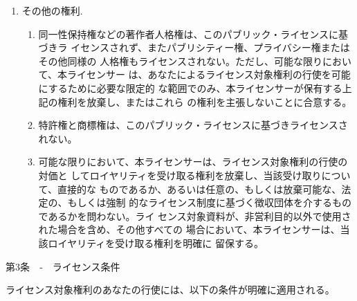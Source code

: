 {\begin{enumerate}
\begin{enumerate}
\begin{enumerate}
ンス対象権利を行使する申込みを、本ライセンサーから自動的に受領する。
\item ダウンストリームの制限の否定 ライセンス対象資料について、追加的な条件
や異なる条件を申込むことにより、もしくはそうした条件を課すことにより、
または効果的な技術的手段を適用することにより、ライセンス対象資料の受領
者によるライセンス対象権利の行使が制限される場合、あなたは、そうした行
為を行うことはできない。
\end{enumerate}
\item 保証の否定 このパブリック・ライセンスのいかなる規定も、あなたは、もし
くはライセンス対象資料のあなたの使用は、本ライセンサーに関連するという
ことを、もしくは条項3(a)(1)(A)(i)の規定に従いクレジット表示を受けるた
めに指定されたその他のものに関連するということを、またはあなたは、もし
くはライセンス対象資料のあなたの使用は、本ライセンサーもしくは当該その
他の者により支援される、保証される、もしくは公的地位を与えられるという
ことを主張する許可ではなく、そうした許可として解釈することはできず、ま
た上記のことを意味しない。
\end{enumerate}
\item その他の権利.
\begin{enumerate}
\item 同一性保持権などの著作者人格権は、このパブリック・ライセンスに基づきラ
イセンスされず、またパブリシティー権、プライバシー権またはその他同様の
人格権もライセンスされない。ただし、可能な限りにおいて、本ライセンサー
は、あなたによるライセンス対象権利の行使を可能にするために必要な限定的
な範囲でのみ、本ライセンサーが保有する上記の権利を放棄し、またはこれら
の権利を主張しないことに合意する。
\item 特許権と商標権は、このパブリック・ライセンスに基づきライセンスされない。
\item 可能な限りにおいて、本ライセンサーは、ライセンス対象権利の行使の対価と
してロイヤリティを受け取る権利を放棄し、当該受け取りについて、直接的な
ものであるか、あるいは任意の、もしくは放棄可能な、法定の、もしくは強制
的なライセンス制度に基づく徴収団体を介するものであるかを問わない。ライ
センス対象資料が、非営利目的以外で使用された場合を含め、その他すべての
場合において、本ライセンサーは、当該ロイヤリティを受け取る権利を明確に
留保する。
\end{enumerate}
\end{enumerate}

第3条　‐　ライセンス条件

ライセンス対象権利のあなたの行使には、以下の条件が明確に適用される。

\begin{enumerate}
\renewcommand{\labelenumi}{\alph{enumi}.}
\renewcommand{\labelenumii}{\arabic{enumii}.}
\renewcommand{\labelenumiii}{\Alph{enumiii}.}


\end{enumerate}}
